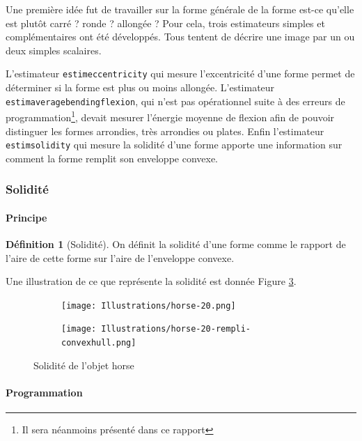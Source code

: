 \documentclass{article}
\theoremstyle{definition}
\newtheorem{definition}{Définition}
\begin{document}
      Une première idée fut de travailler sur la forme générale de la forme \textendash est-ce qu'elle est plutôt carré ? ronde ? allongée ? Pour cela, trois estimateurs simples et complémentaires ont été développés. Tous tentent de décrire une image par un ou deux simples scalaires.
      
      L'estimateur \texttt{estimeccentricity} qui mesure l'excentricité d'une forme permet de déterminer si la forme est plus ou moins allongée. L'estimateur \texttt{estimaveragebendingflexion}, qui n'est pas opérationnel suite à des erreurs de programmation\footnote{Il sera néanmoins présenté dans ce rapport}, devait mesurer l'énergie moyenne de flexion afin de pouvoir distinguer les formes arrondies, très arrondies ou plates. Enfin l'estimateur \texttt{estimsolidity} qui mesure la solidité d'une forme apporte une information sur comment la forme remplit son enveloppe convexe. %
    
      \subsubsection{Solidité}
      
	\paragraph{Principe}
	
	  \begin{definition}[Solidité]
	    On définit la solidité d'une forme comme le rapport de l'aire de cette forme sur l'aire de l'enveloppe convexe.
	  \end{definition}

	   Une illustration de ce que représente la solidité est donnée Figure \ref{solidité}.
	
	  \begin{figure}[!h]
	    \centering
	    \begin{subfigure}{.25\textwidth}
	      \centering
	      \texttt{[image: Illustrations/horse-20.png]}
	      \label{horse}
	    \end{subfigure}
	    \begin{subfigure}{.25\textwidth}
	      \centering
	      \texttt{[image: Illustrations/horse-20-rempli-convexhull.png]}
	    \label{horse-rempli-convexhull}
	    \end{subfigure}
	    \caption{Solidité de l'objet horse}
	    \label{solidité}
	  \end{figure}
	
	\paragraph{Programmation}
	
\end{document}
